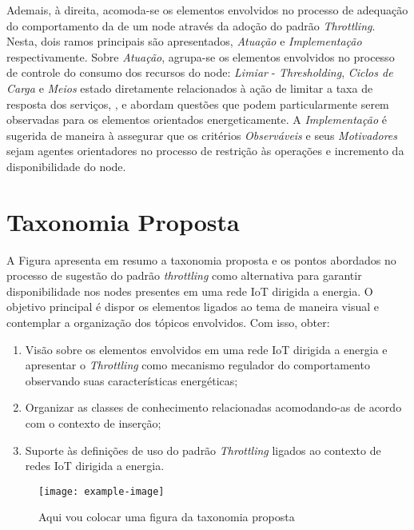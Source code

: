 Ademais, à direita, acomoda-se os elementos envolvidos no processo de adequação do comportamento da de um node através da adoção do padrão \textit{Throttling}. Nesta, dois ramos principais são apresentados, \textit{Atuação} e \textit{Implementação} respectivamente. Sobre \textit{Atuação}, agrupa-se os elementos envolvidos no processo de controle do consumo dos recursos do node: \textit{Limiar} - \textit{Thresholding}, \textit{Ciclos de Carga} e \textit{Meios} estado diretamente relacionados à ação de limitar a taxa de resposta dos serviços,  \cite{khairnar_discrete-rate_2015}, \cite{khan_energy_2015} e \cite{sudevalayam_energy_2011} abordam questões que podem particularmente serem observadas para os elementos orientados energeticamente. A \textit{Implementação} é sugerida de maneira à assegurar que os critérios  \textit{Observáveis} e seus \textit{Motivadores} sejam agentes orientadores no processo de restrição às operações e incremento da disponibilidade do node. 


\section{Taxonomia Proposta}
A Figura apresenta em resumo a taxonomia proposta e os pontos abordados no processo de sugestão do padrão \textit{throttling} como alternativa para garantir disponibilidade nos nodes presentes em uma rede \acs{IoT} dirigida a energia. O objetivo principal é dispor os elementos ligados ao tema de maneira visual e contemplar a organização dos tópicos envolvidos. Com isso, obter:

\begin{enumerate}
    \item Visão sobre os elementos envolvidos em uma rede \acs{IoT} dirigida a energia e apresentar o \textit{Throttling} como mecanismo regulador do comportamento observando suas características energéticas;
    \item Organizar as classes de conhecimento relacionadas acomodando-as de acordo com o contexto de inserção;
    \item Suporte às definições de uso do padrão \textit{Throttling} ligados ao contexto de redes \acs{IoT} dirigida a energia. 
\end{enumerate}

\begin{figure}[h]
\noindent\texttt{[image: example-image]} 
\caption{Aqui vou colocar uma figura da taxonomia proposta}
\label{fig:taxonomia_detalhada}
\centering
\end{figure}


